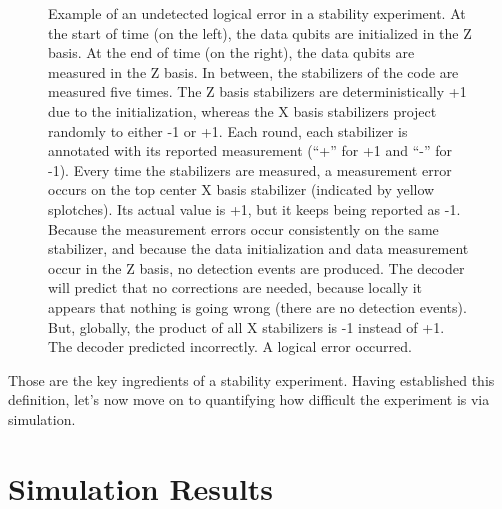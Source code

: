 \documentclass[onecolumn,unpublished,a4paper]{quantumarticle}
\theoremstyle{definition}
\theoremstyle{definition}
\theoremstyle{definition}
\begin{document}
\begin{figure}[ht!]
    \centering
    \caption{
        Example of an undetected logical error in a stability experiment.
        At the start of time (on the left), the data qubits are initialized in the Z basis.
        At the end of time (on the right), the data qubits are measured in the Z basis.
        In between, the stabilizers of the code are measured five times.
        The Z basis stabilizers are deterministically +1 due to the initialization, whereas the X basis stabilizers project randomly to either -1 or +1.
        Each round, each stabilizer is annotated with its reported measurement (``+'' for +1 and ``-'' for -1).
        Every time the stabilizers are measured, a measurement error occurs on the top center X basis stabilizer (indicated by yellow splotches).
        Its actual value is +1, but it keeps being reported as -1.
        Because the measurement errors occur consistently on the same stabilizer, and because the data initialization and data measurement occur in the Z basis, no detection events are produced.
        The decoder will predict that no corrections are needed, because locally it appears that nothing is going wrong (there are no detection events).
        But, globally, the product of all X stabilizers is -1 instead of +1.
        The decoder predicted incorrectly.
        A logical error occurred.
    }
    \label{fig:logical_error}
\end{figure}

Those are the key ingredients of a stability experiment.
Having established this definition, let's now move on to quantifying how difficult the experiment is via simulation.

\section{Simulation Results}
\end{document}
